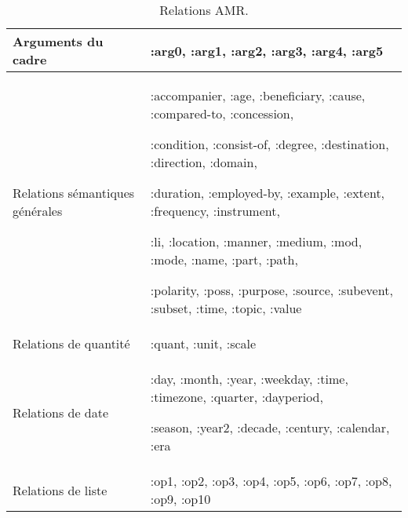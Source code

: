 \documentclass{KBook}
\begin{document}
\begin{table}[ht]
	\centering
	\begin{tabular}{>{\raggedright}p{}>{\raggedright\arraybackslash}p{}}
		\hline\hline
		Arguments du cadre  & 
		:arg0, :arg1, :arg2, :arg3, :arg4, :arg5 \\
		\hline
		Relations sémantiques générales &
		:accompanier, :age, :beneficiary, :cause, :compared-to, :concession, 
		
		:condition, :consist-of, :degree, :destination, :direction, :domain, 
		
		:duration, :employed-by, :example, :extent, :frequency, :instrument, 
		
		:li, :location, :manner, :medium, :mod, :mode, :name, :part, :path, 
		
		:polarity, :poss, :purpose, :source, :subevent, :subset, :time, :topic, :value \\
		\hline
		Relations de quantité &
		:quant, :unit, :scale \\
		\hline
		Relations de date &
		:day, :month,
		:year, :weekday, :time, :timezone, :quarter, :dayperiod, 
		
		:season, :year2, :decade, :century, :calendar, :era \\
		\hline
		Relations de liste & 
		:op1, :op2, :op3, :op4, :op5,
		:op6, :op7, :op8, :op9, :op10\\
		\hline\hline
	\end{tabular}
	\caption{Relations AMR.}
	\label{tab:amr-rel}
\end{table}
\end{document}
